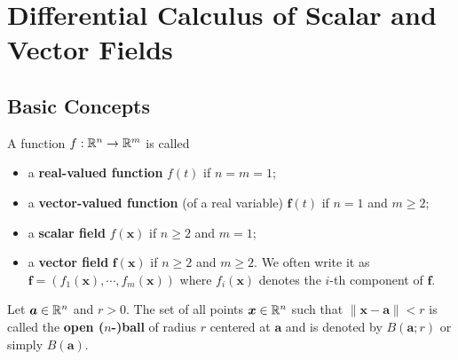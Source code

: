    \chapter{Differential Calculus of Scalar and Vector Fields}
    \section{Basic Concepts}
    \begin{definitionenv}
        A function $f: \mathbb{R}^n \to \mathbb{R}^m$ is called
        \begin{itemize}
            \item a \textbf{real-valued function} $f(t)$ if $n=m=1$;
            \item a \textbf{vector-valued function} (of a real variable) $\bm f (t)$ if $n=1$ and $m\ge 2$;
            \item a \textbf{scalar field} $f(\bm x)$ if $n\ge 2$ and $m=1$;
            \item a \textbf{vector field} $\bm f (\bm x)$ if $n\ge 2$ and $m\ge 2$. We often write it as $\bm f = (f_1(\bm x), \cdots, f_m(\bm x))$ where $f_i(\bm x)$ denotes the $i$-th component of $\bm f$.
        \end{itemize}
    \end{definitionenv}
    \begin{definitionenv}
        Let $\bm a \in \mathbb{R}^n$ and $r>0$. The set of all points $\bm x\in \mathbb{R}^n$ such that $\| \bm x - \bm a\| < r$ is called the \textbf{open ($n$-)ball} of radius $r$ centered at $\bm a$ and is denoted by $B(\bm a; r)$ or simply $B(\bm a)$.
    \end{definitionenv}
